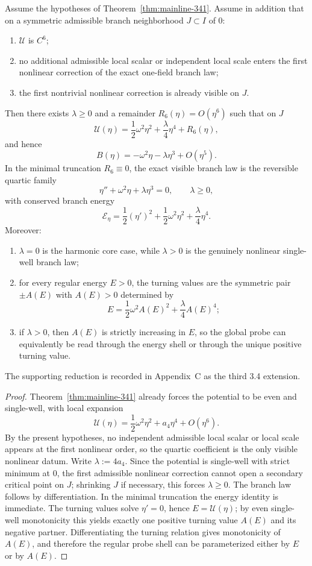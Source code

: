 \begin{theorem}
\label{thm:mainline-342}
Assume the hypotheses of Theorem~\ref{thm:mainline-341}. Assume in addition that on a symmetric admissible branch neighborhood $J\subset I$ of $0$:
\begin{enumerate}[label=(\alph*)]
  \item $\mathcal U$ is $C^6$;
  \item no additional admissible local scalar or independent local scale enters the first nonlinear correction of the exact one-field branch law;
  \item the first nontrivial nonlinear correction is already visible on $J$.
\end{enumerate}
Then there exists $\lambda\ge 0$ and a remainder $R_6(\eta)=O(\eta^6)$ such that on $J$
\[
  \mathcal U(\eta)=\frac12\omega^2\eta^2+\frac{\lambda}{4}\eta^4+R_6(\eta),
\]
and hence
\[
  B(\eta)=-\omega^2\eta-\lambda\eta^3+O(\eta^5).
\]
In the minimal truncation $R_6\equiv 0$, the exact visible branch law is the reversible quartic family
\[
  \eta''+\omega^2\eta+\lambda\eta^3=0,
  \qquad \lambda\ge 0,
\]
with conserved branch energy
\[
  \mathcal E_\eta = \frac12(\eta')^2+\frac12\omega^2\eta^2+\frac{\lambda}{4}\eta^4.
\]
Moreover:
\begin{enumerate}[label=(\roman*)]
  \item $\lambda=0$ is the harmonic core case, while $\lambda>0$ is the genuinely nonlinear single-well branch law;
  \item for every regular energy $E>0$, the turning values are the symmetric pair $\pm A(E)$ with $A(E)>0$ determined by
  \[
    E=\frac12\omega^2A(E)^2+\frac{\lambda}{4}A(E)^4;
  \]
  \item if $\lambda>0$, then $A(E)$ is strictly increasing in $E$, so the global probe can equivalently be read through the energy shell or through the unique positive turning value.
\end{enumerate}
The supporting reduction is recorded in Appendix~C as the third 3.4 extension.
\end{theorem}

\begin{proof}
Theorem~\ref{thm:mainline-341} already forces the potential to be even and single-well, with local expansion
\[
  \mathcal U(\eta)=\frac12\omega^2\eta^2+a_4\eta^4+O(\eta^6).
\]
By the present hypotheses, no independent admissible local scalar or local scale appears at the first nonlinear order, so the quartic coefficient is the only visible nonlinear datum. Write $\lambda:=4a_4$. Since the potential is single-well with strict minimum at $0$, the first admissible nonlinear correction cannot open a secondary critical point on $J$; shrinking $J$ if necessary, this forces $\lambda\ge 0$. The branch law follows by differentiation. In the minimal truncation the energy identity is immediate. The turning values solve $\eta'=0$, hence $E=\mathcal U(\eta)$; by even single-well monotonicity this yields exactly one positive turning value $A(E)$ and its negative partner. Differentiating the turning relation gives monotonicity of $A(E)$, and therefore the regular probe shell can be parameterized either by $E$ or by $A(E)$.
\end{proof}

